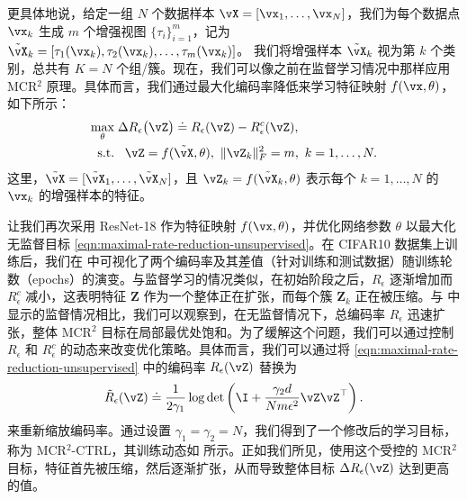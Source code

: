 \documentclass[../../book-main_zh.tex]{subfiles}
\begin{document}
更具体地说，给定一组 $N$ 个数据样本 $\vX =
[\vx_1,\dots,\vx_N]$，我们为每个数据点 $\vx_k$ 生成 $m$ 个增强视图
$\{\tau_i\}_{i=1}^m$，记为
$\tilde{\vX}_{k} = [\tau_1(\vx_k), \tau_2(\vx_k), \dots, \tau_m(\vx_k)]$。
我们将增强样本 $\tilde{\vX}_{k}$ 视为第 $k$ 个类别，总共有 $K=N$ 个组/簇。现在，我们可以像之前在监督学习情况中那样应用 MCR$^2$ 原理。具体而言，我们通过最大化编码率降低来学习特征映射 $f(\vx,\theta)$，如下所示：
\begin{equation}
    \begin{aligned}
        \max_{\theta } & \;  \Delta R_{\epsilon}\big(\vZ \big) \doteq
        R_{\epsilon}(\vZ) - R_{\epsilon}^c(\vZ ), \\
        \mbox{s.t.} & \ \ \, \vZ = f(\tilde{\vX}, \theta),\  \|\vZ_k\|_F^2
        = m,\ k=1,\dots,N.
    \end{aligned}
    \label{eqn:maximal-rate-reduction-unsupervised}
\end{equation}
这里，$\tilde{\vX} = [\tilde{\vX}_1,\dots,\tilde{\vX}_N]$，且 $\vZ_k =
f(\tilde{\vX}_k,\theta)$ 表示每个 $k=1,\dots,N$ 的 $\vx_k$ 的增强样本的特征。

让我们再次采用 ResNet-18 作为特征映射 $f(\vx,\theta)$，并优化网络参数 $\theta$ 以最大化无监督目标 \eqref{eqn:maximal-rate-reduction-unsupervised}。在 CIFAR10 数据集上训练后，我们在  中可视化了两个编码率及其差值（针对训练和测试数据）随训练轮数（epochs）的演变。与监督学习的情况类似，在初始阶段之后，$R_\epsilon$ 逐渐增加而 $R^c_\epsilon$ 减小，这表明特征 $\bm Z$ 作为一个整体正在扩张，而每个簇 $\bm Z_k$ 正在被压缩。与  中显示的监督情况相比，我们可以观察到，在无监督情况下，总编码率 $R_\epsilon$ 迅速扩张，整体 MCR$^2$ 目标在局部最优处饱和。为了缓解这个问题，我们可以通过控制 $R_\epsilon$ 和 $R^c_\epsilon$ 的动态来改变优化策略。具体而言，我们可以通过将 \eqref{eqn:maximal-rate-reduction-unsupervised} 中的编码率 $R_\epsilon(\vZ)$ 替换为
$$\tilde{R}_\epsilon(\vZ) \doteq \frac{1}{2\gamma_1} \log \det
\left(\I + \frac{\gamma_2 d}{N m \epsilon^{2}}\vZ \vZ ^{\top}\right).$$
来重新缩放编码率。通过设置 $\gamma_1 = \gamma_2 = N$，我们得到了一个修改后的学习目标，称为 MCR$^2$-{\scriptsize CTRL}，其训练动态如  所示。正如我们所见，使用这个受控的 MCR$^2$ 目标，特征首先被压缩，然后逐渐扩张，从而导致整体目标 $\Delta R_{\epsilon}(\vZ)$ 达到更高的值。
\end{document}
